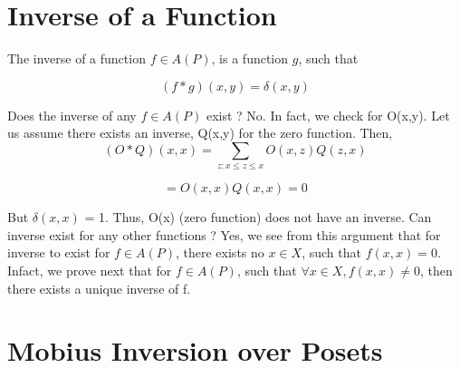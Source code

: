 \section{Inverse of a Function}

The inverse of a function $f \in A(P)$, is a function $g$, such that

$$ (f*g)(x,y) = \delta(x,y)$$

Does the inverse of any $f \in A(P)$ exist ? No. In fact, we check for O(x,y). Let us assume there exists an inverse, Q(x,y) for the zero function. Then,
$$ (O*Q)(x,x) = \sum_{z:x\le z \le x} O(x,z)Q(z,x)$$

$$ = O(x,x)Q(x,x) = 0$$

But $\delta(x,x)$ = 1. Thus, O(x) (zero function) does not have an inverse. Can inverse exist for any other functions ? Yes, we see from this argument that for inverse to exist for $f \in A(P)$, there exists no $x \in X$, such that $f(x,x) = 0$. Infact, we prove next that for $f \in A(P)$, such that $\forall x \in X, f(x,x) \ne 0$, then there exists a unique inverse of f.

\section{Mobius Inversion over Posets}


